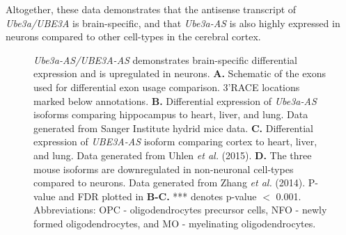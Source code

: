 Altogether, these data demonstrates that the antisense transcript of \textit{Ube3a/UBE3A} is brain-specific, and that \textit{Ube3a-AS} is also highly expressed in neurons compared to other cell-types in the cerebral cortex.

\begin{figure}
  \centering
  \caption{\textit{Ube3a-AS/UBE3A-AS} demonstrates brain-specific differential expression and is upregulated in neurons. \textbf{A.} Schematic of the exons used for differential exon usage comparison. 3'RACE locations marked below annotations. \textbf{B.} Differential expression of \textit{Ube3a-AS} isoforms comparing hippocampus to heart, liver, and lung. Data generated from Sanger Institute hydrid mice data. \textbf{C.} Differential expression of \textit{UBE3A-AS} isoform comparing cortex to heart, liver, and lung. Data generated from Uhlen \textit{et al.} (2015). \textbf{D.} The three mouse isoforms are downregulated in non-neuronal cell-types compared to neurons. Data generated from Zhang \textit{et al.} (2014). P-value and FDR plotted in \textbf{B-C.} *** denotes p-value $<$ 0.001. Abbreviations: OPC - oligodendrocytes precursor cells, NFO - newly formed oligodendrocytes, and MO - myelinating oligodendrocytes.}
  \label{brain specific}
\end{figure}

